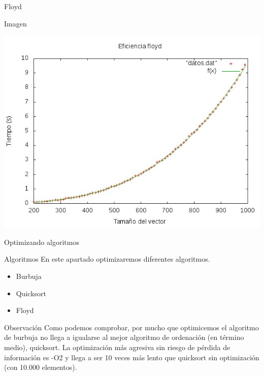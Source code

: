 \documentclass[compress]{beamer}
\begin{document}
\begin{frame}{Floyd}
	\begin{alertblock}{Imagen}
	\begin{center}
	\includegraphics[scale=0.55]{../Graficas/Floyd/floydO0_ruben.jpeg}	
	\end{center}
	\end{alertblock}
\end{frame}


\begin{frame}{Optimizando algoritmos}
	\begin{block}{Algoritmos}
	En este apartado optimizaremos diferentes algoritmos.
	\begin{itemize}
	\item Burbuja
	\item Quicksort
	\item Floyd
	\end{itemize}
	\end{block}
	
	\pause
	\begin{block}{Observación}
	Como podemos comprobar, por mucho que optimicemos el algoritmo de burbuja no llega a igualarse al mejor algoritmo de ordenación (en término medio), quicksort. La optimización más agresiva sin riesgo de pérdida de información es -O2 y llega a ser 10 veces más lento que quicksort sin optimización (con 10.000 elementos).
	\end{block}
\end{frame}


\end{document}
